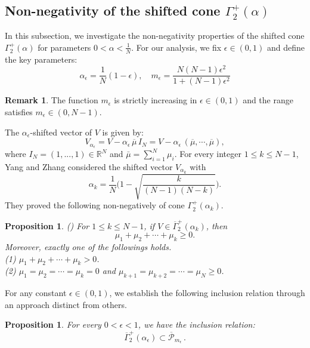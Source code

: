 \documentclass[12pt, twoside]{article}
\newtheorem{proposition}[theorem]{Proposition}
\theoremstyle{definition}
\newtheorem{remark}[theorem]{Remark}
\numberwithin{equation}{section}
\def \a {\alpha }
\def\Ga{\Gamma}
\begin{document}
\subsection{Non-negativity of the shifted cone $\Gamma^{+}_{2}(\alpha)$}
In this subsection, we investigate the non-negativity properties of the shifted cone $\Gamma^{+}_{2}(\alpha)$ for parameters $0<\a<\frac{1}{N}$. For our analysis, we fix $\epsilon\in(0,1)$ and define the key parameters:
\begin{equation}\label{alpha m}
\alpha_\epsilon=\frac{1}{N}(1-\epsilon), \quad
m_\epsilon = \frac{N(N-1)\epsilon^2}{1+(N-1)\epsilon^2}
\end{equation}
\begin{remark}
The function $m_{\epsilon}$ is strictly increasing in $\epsilon\in(0,1)$ and the range satisfies $m_{\epsilon}\in(0, N-1)$.
\end{remark}
The $\a_\epsilon$-shifted vector of $V$ is given by:
$$V_{\alpha_{\epsilon}}=V-\alpha_{\epsilon}\,\overline{\mu}\,I_{N}=V-\alpha_{\epsilon}\,(\overline{\mu},\cdots,\overline{\mu}),$$
where $I_N = (1,...,1)\in\mathbb{R}^{N}$ and $\bar{\mu}=\sum_{i=1}^{N}\mu_{i}$. For every integer $1\leq k\leq N-1$, Yang and Zhang \cite{YZ25} considered the shifted vector $V_{\a_{k}}$ with
$$\alpha_{k}=\frac{1}{N}\Big(1-\sqrt{\frac{k}{(N-1)(N-k)}}\Big).$$
They proved the following non-negatively of cone $\Gamma^{+}_{2}(\a_{k})$.
\begin{proposition}(\cite[Lemma 2.4]{YZ25})
For $1\leq k\leq N-1$, if $V\in\overline{\Ga}^{+}_{2}(\a_{k})$, then
$$\mu_{1}+\mu_{2}+\cdots+\mu_{k}\geq0.$$
Moreover, exactly one of the followings holds.\\
(1) $\mu_{1}+\mu_{2}+\cdots+\mu_{k}>0$.\\
(2) $\mu_{1}=\mu_{2}=\cdots=\mu_{k}=0$ and $\mu_{k+1}=\mu_{k+2}=\cdots=\mu_{N}\geq0$.
\end{proposition}
For any constant $\epsilon\in(0,1)$, we establish the following inclusion relation through an approach distinct from others.
\begin{proposition}\label{cone inclusion}
For every $0<\epsilon<1$, we have the inclusion relation:
\begin{equation}
\overline{\Gamma}^{+}_{2}(\alpha_{\epsilon})\subset \overline{\mathcal{P}}_{m_{\epsilon}}\,.
\end{equation}
\end{proposition}
\end{document}
